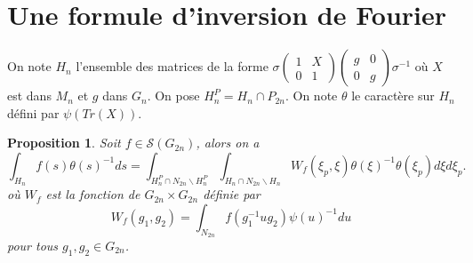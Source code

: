 \documentclass{amsart}
\newtheorem{proposition}{Proposition}[section]
\begin{document}
\section{Une formule d'inversion de Fourier}
\label{formInv}
On note $H_n$ l'ensemble des matrices de la forme $\sigma \begin{pmatrix}
1 & X \\
0 & 1
\end{pmatrix}\begin{pmatrix}
g & 0 \\
0 & g
\end{pmatrix} \sigma^{-1}$ où $X$ est dans $M_n$ et $g$ dans $G_n$. On pose $H^P_n = H_n \cap P_{2n}$. On note $\theta$ le caractère sur $H_n$ défini par $\psi(Tr(X))$.

\begin{proposition}
\label{unfolding}
Soit $f \in \mathcal{S}(G_{2n})$, alors on a
\begin{equation}
\int_{H_n} f(s) \theta(s)^{-1} ds = \int_{H^P_n \cap N_{2n} \backslash{H^P_n}} \int_{H_n \cap N_{2n} \backslash{H_n}} W_f(\xi_p, \xi) \theta(\xi)^{-1} \theta(\xi_p) d\xi d\xi_p .
\end{equation}
où $W_f$ est la fonction de $G_{2n} \times G_{2n}$ définie par
\begin{equation}
W_f(g_1,g_2) = \int_{N_{2n}} f(g_1^{-1}ug_2) \psi(u)^{-1} du
\end{equation}
pour tous $g_1, g_2 \in G_{2n}$.
\end{proposition}
\end{document}
